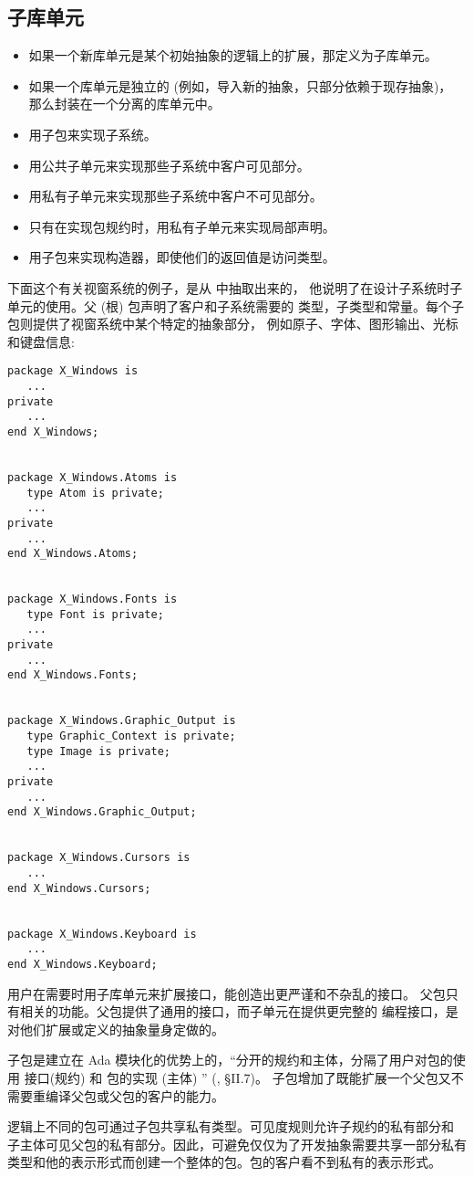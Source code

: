 \subsection{子库单元}
\label{c:prog-struct:high-level:child-lib-unit}
\begin{itemize}
\item 如果一个新库单元是某个初始抽象的逻辑上的扩展，那定义为子库单元。
\item 如果一个库单元是独立的 (例如，导入新的抽象，只部分依赖于现存抽象)，
那么封装在一个分离的库单元中。
\item 用子包来实现子系统。
\item 用公共子单元来实现那些子系统中客户可见部分。
\item 用私有子单元来实现那些子系统中客户不可见部分。
\item 只有在实现包规约时，用私有子单元来实现局部声明。
\item 用子包来实现构造器，即使他们的返回值是访问类型。
\end{itemize}

\begin{blockindent}
下面这个有关视窗系统的例子，是从 \cite{cohen93} 中抽取出来的，
他说明了在设计子系统时子单元的使用。父 (根) 包声明了客户和子系统需要的
类型，子类型和常量。每个子包则提供了视窗系统中某个特定的抽象部分，
例如原子、字体、图形输出、光标和键盘信息:
\begin{lstlisting}
package X_Windows is
   ...
private
   ...
end X_Windows;


package X_Windows.Atoms is
   type Atom is private;
   ...
private
   ...
end X_Windows.Atoms;


package X_Windows.Fonts is
   type Font is private;
   ...
private
   ...
end X_Windows.Fonts;


package X_Windows.Graphic_Output is
   type Graphic_Context is private;
   type Image is private;
   ...
private
   ...
end X_Windows.Graphic_Output;


package X_Windows.Cursors is
   ...
end X_Windows.Cursors;


package X_Windows.Keyboard is
   ...
end X_Windows.Keyboard;
\end{lstlisting}
\end{blockindent}

\begin{blockindent}
用户在需要时用子库单元来扩展接口，能创造出更严谨和不杂乱的接口。
父包只有相关的功能。父包提供了通用的接口，而子单元在提供更完整的
编程接口，是对他们扩展或定义的抽象量身定做的。

子包是建立在 Ada 模块化的优势上的，``分开的规约和主体，分隔了用户对包的使用
接口(规约) 和 包的实现 (主体) '' (\cite{rational95}, \S{}II.7)。
子包增加了既能扩展一个父包又不需要重编译父包或父包的客户的能力。

逻辑上不同的包可通过子包共享私有类型。可见度规则允许子规约的私有部分和
子主体可见父包的私有部分。因此，可避免仅仅为了开发抽象需要共享一部分私有
类型和他的表示形式而创建一个整体的包。包的客户看不到私有的表示形式。

\end{blockindent}
